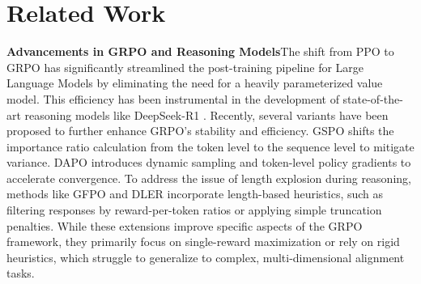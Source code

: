 \documentclass{llmxive}
\begin{document}






\section{Related Work}

\textbf{Advancements in GRPO and Reasoning Models}\quad The shift from PPO \citep{ppo} to GRPO \citep{grpo} has significantly streamlined the post-training pipeline for Large Language Models by eliminating the need for a heavily parameterized value model. This efficiency has been instrumental in the development of state-of-the-art reasoning models like DeepSeek-R1 \citep{deepseek-r1}. Recently, several variants have been proposed to further enhance GRPO’s stability and efficiency. GSPO \citep{gspo} shifts the importance ratio calculation from the token level to the sequence level to mitigate variance. DAPO \citep{dapo} introduces dynamic sampling and token-level policy gradients to accelerate convergence. To address the issue of length explosion during reasoning, methods like GFPO \citep{gfpo} and DLER \citep{dler} incorporate length-based heuristics, such as filtering responses by reward-per-token ratios or applying simple truncation penalties. While these extensions improve specific aspects of the GRPO framework, they primarily focus on single-reward maximization or rely on rigid heuristics, which struggle to generalize to complex, multi-dimensional alignment tasks.
\end{document}
